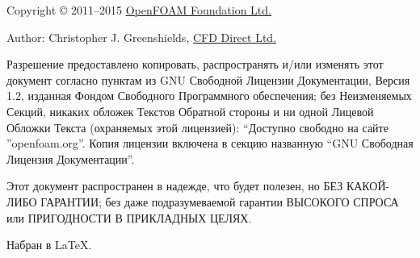 
Copyright \copyright{} 2011--2015 \href{http://openfoam.org}{OpenFOAM Foundation Ltd.}\par
Author: Christopher J. Greenshields, \href{http://cfd.direct}{CFD Direct Ltd.}

Разрешение предоставлено копировать, распространять и/или изменять этот документ согласно пунктам из GNU
 Свободной Лицензии Документации, Версия 1.2, изданная Фондом Свободного Программного обеспечения; без Неизменяемых Секций,
 никаких обложек Текстов Обратной стороны и ни одной Лицевой Обложки Текста (охраняемых этой лицензией):
“Доступно свободно на сайте ”openfoam.org”. Копия лицензии включена в секцию названную “GNU Свободная Лицензия Документации”.

Этот документ распространен в надежде, что будет полезен, но БЕЗ КАКОЙ-ЛИБО ГАРАНТИИ; без даже подразумеваемой гарантии
 ВЫСОКОГО СПРОСА или ПРИГОДНОСТИ В ПРИКЛАДНЫХ ЦЕЛЯХ.

\noindent
Набран в \LaTeX.